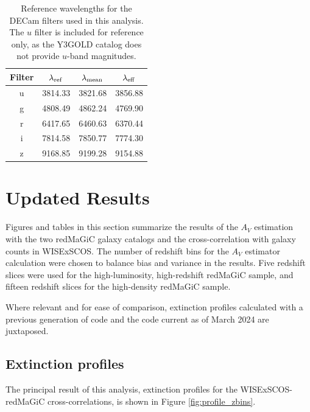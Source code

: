 \documentclass[11pt, oneside]{article}   	%
\begin{document}
\normalsize

\begin{table}
    \centering
    \begin{tabular}{|c|c|c|c|}
        \hline
        Filter & $\lambda_{\rm ref}$ & $\lambda_{\rm mean}$ & $\lambda_{\rm eff}$ \\
        \hline
        u & 3814.33 & 3821.68 & 3856.88 \\
        \hline
        g & 4808.49 & 4862.24 & 4769.90 \\
        \hline
        r & 6417.65 & 6460.63 & 6370.44 \\
        \hline
        i & 7814.58 & 7850.77 & 7774.30 \\
        \hline
        z & 9168.85 & 9199.28 & 9154.88 \\
        \hline
    \end{tabular}
    \caption{Reference wavelengths for the DECam filters used in this analysis. The $u$ filter is included for reference only, as the Y3GOLD catalog does not provide $u$-band magnitudes.}
    \label{tab:filters}
\end{table}



\section{Updated Results}\label{sec:results}

Figures and tables in this section summarize the results of the $A_V$ estimation with the two redMaGiC galaxy catalogs and the cross-correlation with galaxy counts in WISExSCOS. The number of redshift bins for the $A_V$ estimator calculation were chosen to balance bias and variance in the results. Five redshift slices were used for the high-luminosity, high-redshift redMaGiC sample, and fifteen redshift slices for the high-density redMaGiC sample. 

Where relevant and for ease of comparison, extinction profiles calculated with a previous generation of code and the code current as of March 2024 are juxtaposed.

\subsection{Extinction profiles}\label{sec:results:profiles}

The principal result of this analysis, extinction profiles for the WISExSCOS-redMaGiC cross-correlations, is shown in Figure \ref{fig:profile_zbins}. 
\end{document}

